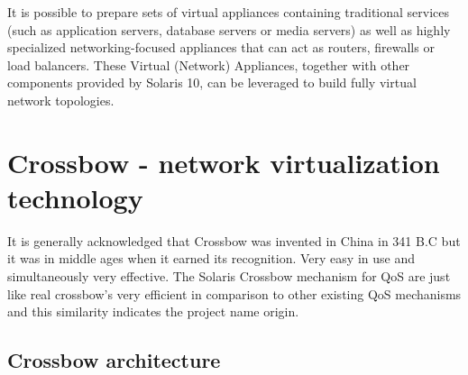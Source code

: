 \documentclass[11pt]{book}
\begin{document}
        It is possible to prepare sets of virtual appliances containing traditional services (such as application
        servers, database servers or media servers) as well as highly specialized networking-focused appliances that can
        act as routers, firewalls or load balancers. These Virtual (Network) Appliances, together with other components
        provided by Solaris 10,  can be leveraged to build fully virtual network topologies.

      

    \section{Crossbow - network virtualization technology}


        It is generally acknowledged that Crossbow was invented in China in 341 B.C but it was in middle ages when 
        it earned its recognition. Very easy in use and simultaneously very effective. The Solaris Crossbow mechanism 
        for QoS are just like real crossbow's very efficient in comparison to other existing QoS mechanisms and this
        similarity indicates the project name origin.

    \subsection{Crossbow architecture}
\end{document}
